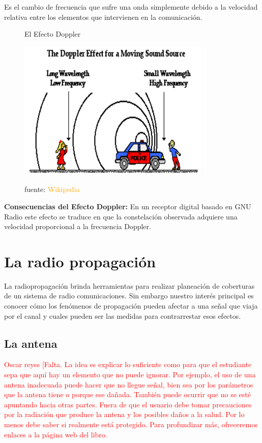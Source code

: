 Es el cambio de frecuencia que sufre una onda simplemente debido a la velocidad relativa entre los elementos que intervienen en la comunicación.\\

\begin{figure}[h!]
	\captionsetup{justification = raggedright, singlelinecheck = false}
	\caption{El Efecto Doppler} 
	\centering
	\includegraphics[scale=1]{Imagenes/Policia.png}
	\label{fig:Policia}
		\caption*{fuente: \textcolor{
			Orange}{Wikipedia}}
\end{figure}

\textbf{Consecuencias del Efecto Doppler:} En un receptor digital basado en GNU Radio este efecto se traduce en que la constelación observada adquiere una velocidad proporcional a la frecuencia Doppler.

\section{La radio propagación}

La radiopropagación brinda herramientas para realizar planeación de coberturas de un sistema de radio comunicaciones. Sin embargo nuestro interés principal es conocer cómo los fenómenos de propagación pueden afectar a una señal que viaja por el canal y cuales pueden ser las medidas para contrarrestar esos efectos. \\

\subsection{La antena}
\textcolor{red}{Oscar reyes}
\textcolor{red}{[Falta. La idea es explicar lo suficiente como para que el estudiante sepa que aquí hay un elemento que no puede ignorar. Por ejemplo, el uso de una antena inadecuada puede hacer que no llegue señal, bien sea por los parámetros que la antena tiene o porque ese dañada. También puede ocurrir que no se esté apuntando hacia otras partes. Fuera de que el usuario debe tomar precauciones por la radiación que produce la antena y los posibles daños a la salud. Por lo menos debe saber si realmente está protegido. Para profundizar más, ofreceremos enlaces a la página web del libro.}\\ %

